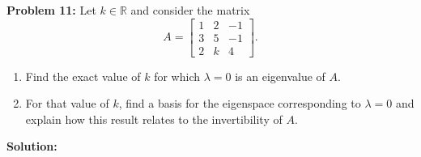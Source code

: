\documentclass[11pt, letterpaper]{article}
\theoremstyle{definition}
\theoremstyle{remark}
\begin{document}
\vspace{0.4em}
\textbf{Problem 11:}
Let $k \in \mathbb{R}$ and consider the matrix
\[
A = \begin{bmatrix} 1 & 2 & -1 \\ 3 & 5 & -1 \\ 2 & k & 4 \end{bmatrix}.
\]
\begin{enumerate}[label=(\alph*)]
    \item Find the exact value of $k$ for which $\lambda = 0$ is an eigenvalue of $A$.
    \item For that value of $k$, find a basis for the eigenspace corresponding to $\lambda = 0$ and explain how this result relates to the invertibility of $A$.
\end{enumerate}

\textbf{Solution:}
\end{document}
